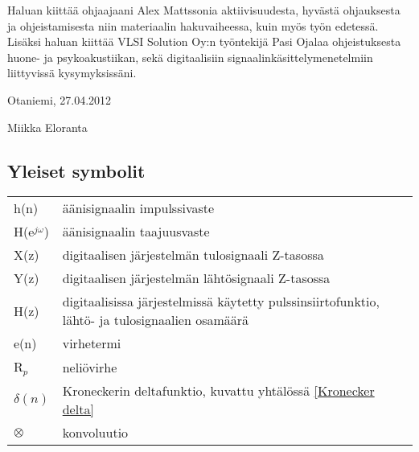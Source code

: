 \documentclass[finnish,12pt]{article}
\begin{document}

Haluan kiittää ohjaajaani Alex Mattssonia aktiivisuudesta, hyvästä ohjauksesta ja ohjeistamisesta niin materiaalin hakuvaiheessa, kuin myös työn edetessä. Lisäksi haluan kiittää VLSI Solution Oy:n työntekijä Pasi Ojalaa ohjeistuksesta huone- ja psykoakustiikan, sekä digitaalisiin signaalinkäsittelymenetelmiin liittyvissä kysymyksissäni.


\vspace{5cm}
Otaniemi, 27.04.2012

\vspace{5mm}
{\hfill Miikka Eloranta \hspace{1cm}}

\newpage

\tableofcontents


\subsection*{Yleiset symbolit}

\begin{tabular}{p{2cm}p{12cm}}

h(n)					& äänisignaalin impulssivaste \\
H(e$^{j \omega}$)		& äänisignaalin taajuusvaste \\
X(z)					& digitaalisen järjestelmän tulosignaali Z-tasossa \\
Y(z)					& digitaalisen järjestelmän lähtösignaali Z-tasossa \\
H(z)					& digitaalisissa järjestelmissä käytetty pulssinsiirtofunktio, lähtö- ja tulosignaalien osamäärä \\
e(n)					& virhetermi \\
R$_p$					& neliövirhe \\
$\delta(n)$				& Kroneckerin deltafunktio, kuvattu yhtälössä \eqref{Kronecker delta} \\
$\otimes$				& konvoluutio \\
\end{tabular}
\end{document}
